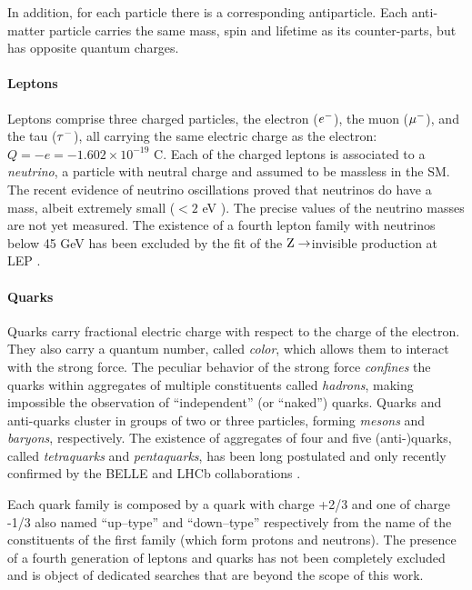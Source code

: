 In addition, for each particle there is a corresponding antiparticle. Each anti-matter particle carries the same mass, spin and lifetime as its counter-parts, but has opposite quantum charges.

\paragraph{Leptons} 

Leptons comprise three charged particles, the electron ($e\-$), the muon ($\mu\-$), and the tau ($\tau\-$), all carrying the same electric charge as the electron: $Q = -e = -1.602 \times 10^{-19}$ C. Each of the charged leptons is associated to a \emph{neutrino}, a particle with neutral charge and assumed to be massless in the SM. The recent evidence of neutrino oscillations \cite{Agafonova:2010dc} proved that neutrinos do have a mass, albeit extremely small ($< 2$ eV \cite{pdg}). The precise values of the neutrino masses are not yet measured. The existence of a fourth lepton family with neutrinos below 45 GeV has been excluded by the fit of the $\Z\To$invisible production at LEP \cite{ALEPH:2005ab}. 

\paragraph{Quarks}

Quarks carry fractional electric charge with respect to the charge of the electron. They also carry a quantum number, called \emph{color}, which allows them to interact with the strong force. The peculiar behavior of the strong force \emph{confines} the quarks within aggregates of multiple constituents called \emph{hadrons}, making impossible the observation of ``independent'' (or ``naked'') quarks. Quarks and anti-quarks cluster in groups of two or three particles, forming \emph{mesons} and \emph{baryons}, respectively. The existence of aggregates of four and five (anti-)quarks, called \emph{tetraquarks} and \emph{pentaquarks}, has been long postulated and only recently confirmed by the BELLE \cite{Choi:2007wga} and LHCb collaborations \cite{Aaij:2014jqa}.

Each quark family is composed by a quark with charge +2/3 and one of charge -1/3 also named ``up--type'' and ``down--type'' respectively from the name of the constituents of the first family (which form protons and neutrons). The presence of a fourth generation of leptons and quarks has not been completely excluded and is object of dedicated searches that are beyond the scope of this work.

